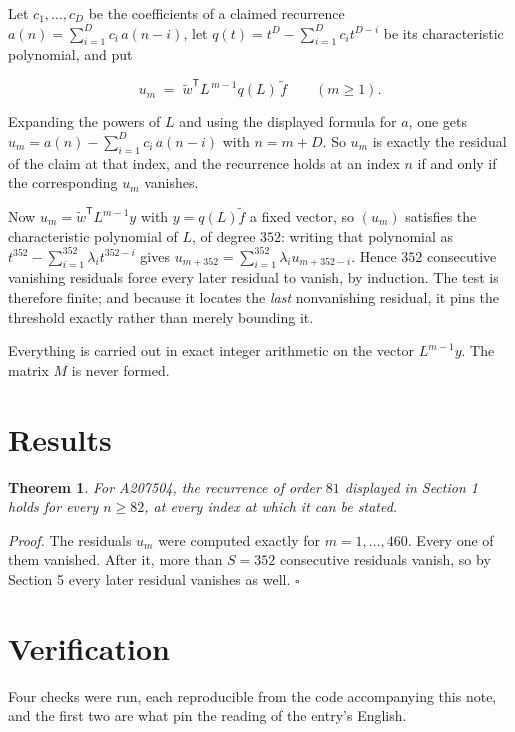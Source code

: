 \documentclass[11pt]{article}
\newtheorem{theorem}{Theorem}
\theoremstyle{definition}
\begin{document}
Let $c_1,\dots,c_D$ be the coefficients of a claimed recurrence $a(n) = \sum_{i=1}^{D} c_i\,a(n-i)$, let $q(t) = t^{D} - \sum_{i=1}^{D} c_i t^{D-i}$ be its characteristic polynomial, and put

\[u_m \;=\; \tilde w^{\mathsf T} L^{\,m-1} q(L)\,\tilde f \qquad (m \ge 1).\]

Expanding the powers of $L$ and using the displayed formula for $a$, one gets $u_m = a(n) - \sum_{i=1}^{D} c_i\,a(n-i)$ with $n = m + D$. So $u_m$ is exactly the residual of the claim at that index, and the recurrence holds at an index $n$ if and only if the corresponding $u_m$ vanishes.

Now $u_m = \tilde w^{\mathsf T} L^{m-1} y$ with $y = q(L)\tilde f$ a fixed vector, so $(u_m)$ satisfies the characteristic polynomial of $L$, of degree $352$: writing that polynomial as $t^{352} - \sum_{i=1}^{352} \lambda_i t^{352-i}$ gives $u_{m+352} = \sum_{i=1}^{352} \lambda_i u_{m+352-i}$. Hence $352$ consecutive vanishing residuals force every later residual to vanish, by induction. The test is therefore finite; and because it locates the {\itshape last} nonvanishing residual, it pins the threshold exactly rather than merely bounding it.

Everything is carried out in exact integer arithmetic on the vector $L^{m-1}y$. The matrix $M$ is never formed.

\section{Results}

\begin{theorem} For A207504, the recurrence of order $81$ displayed in Section 1 holds for every $n \ge 82$, at every index at which it can be stated.\end{theorem}

{\itshape Proof.} The residuals $u_m$ were computed exactly for $m = 1,\dots,460$. Every one of them vanished. After it, more than $S = 352$ consecutive residuals vanish, so by Section 5 every later residual vanishes as well. $\square$

\section{Verification}

Four checks were run, each reproducible from the code accompanying this note, and the first two are what pin the reading of the entry's English.
\end{document}
